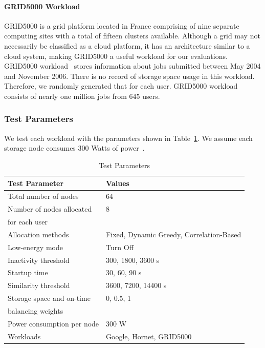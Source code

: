 \paragraph{GRID5000 Workload}
GRID5000 is a grid platform located in France comprising of nine separate computing
sites with a total of fifteen clusters available. Although a grid may not necessarily
be classified as a cloud platform, it has an architecture similar to a cloud system,
making GRID5000 a useful workload for our evaluations. GRID5000 workload~\cite{grid5000}
stores information about jobs submitted between May 2004 and November 2006. There is
no record of storage space usage in this workload.  Therefore, we randomly generated
that for each user. GRID5000 workload consists of nearly one million jobs from 645
users. 

\subsubsection{Test Parameters}
We test each workload with the parameters shown in Table~\ref{tbl:params}. We assume each storage
node consumes 300 Watts of power~\cite{DBLP:journals/computer/BianchiniR04}.

\begin{table}[!htbp]
 \begin{center}
  \begin{tabular}{|l|l|} \hline
Test Parameter & Values \\ \hline
Total number of nodes          & 64 \\ \hline
Number of nodes allocated        & 8 \\
for each user              & \\ \hline
Allocation methods           & Fixed, Dynamic Greedy, Correlation-Based \\ \hline
Low-energy mode             & Turn Off \\ \hline
Inactivity threshold          & 300, 1800, 3600 s \\ \hline
Startup time              & 30, 60, 90 s \\ \hline
Similarity threshold          & 3600, 7200, 14400 s \\ \hline
Storage space and on-time        & 0, 0.5, 1 \\
balancing weights            & \\ \hline
Power consumption per node       & 300 W \\ \hline
Workloads                        & Google, Hornet, GRID5000 \\ \hline
  \end{tabular}
 \end{center}
 \caption{Test Parameters}
 \label{tbl:params}
\end{table}

